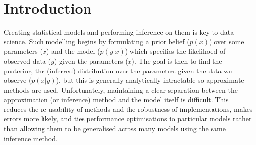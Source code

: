 \documentclass[sigconf,timestamp]{acmart}
\begin{document}



\maketitle

\section{Introduction}
\label{s:introduction}

Creating statistical models and performing inference on them is key to data science. Such modelling begins by formulating a prior belief ($p(x)$) over some parameters ($x$) and the model ($p(y|x)$) which specifies the likelihood of observed data ($y$) given the parameters ($x$). The goal is then to find the posterior, the (inferred) distribution over the parameters given the data we observe ($p(x|y)$), but this is generally analytically intractable so approximate methods are used. Unfortunately, maintaining a clear separation between the approximation (or inference) method and the model itself is difficult. This reduces the re-usability of methods and the robustness of implementations, makes errors more likely, and ties performance optimisations to particular models rather than allowing them to be generalised across many models using the same inference method.
\end{document}

